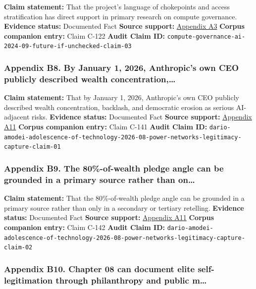 \documentclass[
  american,
  11pt,
  letterpaper,
]{article}
\begin{document}
\textbf{Claim statement:} That the project's language of chokepoints and
access stratification has direct support in primary research on compute
governance. \textbf{Evidence status:} Documented Fact \textbf{Source
support:}
\hyperref[ch-09-appendix-a3-computing-power-and-the-governance-of-artificial-intelligence]{Appendix
A3} \textbf{Corpus companion entry:} Claim C-122 \textbf{Audit Claim
ID:} \texttt{compute-governance-ai-2024-09-future-if-unchecked-claim-03}

\subsubsection{Appendix B8. By January 1, 2026, Anthropic's own CEO
publicly described wealth
concentration,\ldots{}}\label{ch-09-appendix-b8-by-january-1-2026-anthropic-s-own-ceo-publicly-described-wealth-concentration}

\textbf{Claim statement:} That by January 1, 2026, Anthropic's own CEO
publicly described wealth concentration, backlash, and democratic
erosion as serious AI-adjacent risks. \textbf{Evidence status:}
Documented Fact \textbf{Source support:}
\hyperref[ch-09-appendix-a11-the-adolescence-of-technology]{Appendix
A11} \textbf{Corpus companion entry:} Claim C-141 \textbf{Audit Claim
ID:}
\texttt{dario-amodei-adolescence-of-technology-2026-08-power-networks-legitimacy-capture-claim-01}

\subsubsection{Appendix B9. The 80\%-of-wealth pledge angle can be
grounded in a primary source rather than
on\ldots{}}\label{ch-09-appendix-b9-the-80-of-wealth-pledge-angle-can-be-grounded-in-a-primary-source-rather-than-on}

\textbf{Claim statement:} That the 80\%-of-wealth pledge angle can be
grounded in a primary source rather than only in a secondary or tertiary
retelling. \textbf{Evidence status:} Documented Fact \textbf{Source
support:}
\hyperref[ch-09-appendix-a11-the-adolescence-of-technology]{Appendix
A11} \textbf{Corpus companion entry:} Claim C-142 \textbf{Audit Claim
ID:}
\texttt{dario-amodei-adolescence-of-technology-2026-08-power-networks-legitimacy-capture-claim-02}

\subsubsection{Appendix B10. Chapter 08 can document elite
self-legitimation through philanthropy and public
m\ldots{}}\label{ch-09-appendix-b10-chapter-08-can-document-elite-self-legitimation-through-philanthropy-and-public-m}
\end{document}
